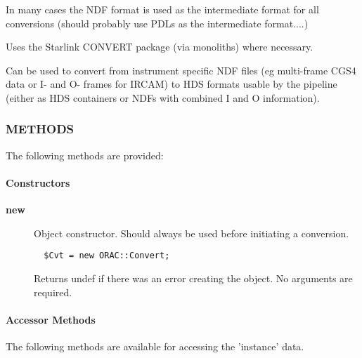 In many cases the NDF format is used as the intermediate format for
all conversions (should probably use PDLs as the intermediate
format....)



Uses the Starlink CONVERT package (via monoliths) where necessary.



Can be used to convert from instrument specific NDF files (eg
multi-frame CGS4 data or I- and O- frames for IRCAM) to HDS formats
usable by the pipeline (either as HDS containers or NDFs with combined
I and O information).

\subsubsection*{METHODS\label{ORAC::Convert_METHODS}}

The following methods are provided:

\paragraph*{Constructors\label{ORAC::Convert_Constructors}}\begin{description}
\item[\textbf{new}] \mbox{}

Object constructor. Should always be used before initiating a conversion.

\begin{verbatim}
  $Cvt = new ORAC::Convert;
\end{verbatim}


Returns undef if there was an error creating the object. No arguments
are required.

\end{description}
\paragraph*{Accessor Methods\label{ORAC::Convert_Accessor_Methods}}

The following methods are available for accessing the 
'instance' data.


